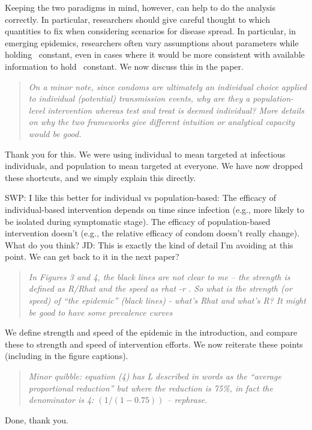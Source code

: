 Keeping the two paradigms in mind, however, can help to do the analysis correctly. 
In particular, researchers should give careful thought to which quantities to fix when considering scenarios for disease spread. 
In particular, in emerging epidemics, researchers often vary assumptions about parameters while holding \RR\ constant, even in cases where it would be more consistent with available information to hold \rr\ constant.
We now discuss this in the paper.

\begin{quote}\sl
On a minor note, since condoms are ultimately an individual choice
applied to individual (potential) transmission events, why are they a
population-level intervention whereas test and treat is deemed
individual? More details on why the two frameworks give different
intuition or analytical capacity would be good.
\end{quote}

Thank you for this. We were using individual to mean targeted at
infectious individuals, and population to mean targeted at everyone. We
have now dropped these shortcuts, and we simply explain this directly.

SWP: I like this better for individual vs population-based: The efficacy
of individual-based intervention depends on time since infection (e.g.,
more likely to be isolated during symptomatic stage). The efficacy of
population-based intervention doesn't (e.g., the relative efficacy of
condom doesn't really change). What do you think?
JD: This is exactly the kind of detail I'm avoiding at this point. We can get back to it in the next paper?

\begin{quote}\sl
In Figures 3 and 4, the black lines are not clear to me -- the strength
is defined as R/Rhat and the speed as rhat -r . So what is the strength
(or speed) of ``the epidemic'' (black lines) - what's Rhat and what's R?
It might be good to have some prevalence curves
\end{quote}

We define strength and speed of the epidemic in the introduction, and
compare these to strength and speed of intervention efforts. We now
reiterate these points (including in the figure captions).

\begin{quote}\sl
Minor quibble: equation (4) has L described in words as the ``average
proportional reduction'' but where the reduction is 75\%, in fact the
denominator is 4: $(1 / (1-0.75) )$ -- rephrase.
\end{quote}

Done, thank you.

